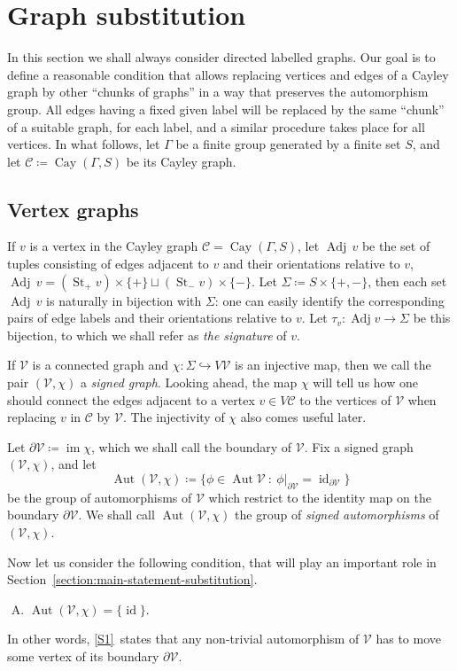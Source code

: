 \documentclass[ALCO,ThmDefs,Unicode,epreuves]{cedram}
\newcommand{\cC}{\mathcal{C}}
\newcommand{\cV}{\mathcal{V}}
\DeclareMathOperator{\St}{St}
\DeclareMathOperator{\Cay}{Cay}
\DeclareMathOperator{\aut}{Aut}
\DeclareMathOperator{\im}{im}
\DeclareMathOperator{\adj}{Adj}
\DeclareMathOperator{\id}{id}
\begin{document}
\section{Graph substitution}\label{graph-substitution}
In this section we shall always consider directed labelled graphs. Our goal is to define a reasonable condition that allows replacing vertices and edges of a Cayley graph by other ``chunks of graphs'' in a way that preserves the automorphism group. All edges having a fixed given label will be replaced by the same ``chunk'' of a suitable graph, for each label, and a similar procedure takes place for all vertices. In what follows, let $\Gamma$ be a finite group generated by a finite set $S$, and let $\cC \coloneqq \Cay(\Gamma, S)$ be its Cayley graph.

\subsection{Vertex graphs}\label{vertex-graphs-substitution}

If $v$ is a vertex in the Cayley graph $\cC = \Cay(\Gamma, S)$, let $\adj\, v$ be the set of tuples consisting of edges adjacent to $v$ and their orientations relative to $v$, \ie $\adj\, v = (\St_+ v){\times}\{+\} {\sqcup} (\St_- v){\times}\{-\}$. Let ${\Sigma}\coloneqq S{\times}\{+,-\}$, then each set $\adj\, v$ is naturally in bijection with ${\Sigma}$: one can easily identify the corresponding pairs of edge labels and their orientations relative to $v$. Let ${\tau}_v: \adj v \to {\Sigma}$ be this bijection, to which we shall refer as \emph{the signature} of $v$.

If $\cV$ is a connected graph and ${\chi}:{\Sigma}{\hookrightarrow}V\cV$ is an injective map, then we call the pair $(\cV,{\chi})$ a \emph{signed graph}. Looking ahead, the map ${\chi}$ will tell us how one should connect the edges adjacent to a vertex $v \in V\cC$ to the vertices of $\cV$ when replacing $v$ in $\cC$ by $\cV$. The injectivity of ${\chi}$ also comes useful later.
 
Let ${\partial}\cV\coloneqq \im {\chi}$, which we shall call the boundary of $\cV$. Fix a signed graph $(\cV, \chi)$, and let
\[
\aut(\cV,{\chi}) \coloneqq \{{\phi} \in \aut \cV\ :\ {\phi}|_{{\partial}\cV} = \id _{{\partial}\cV}\}
\]
be the group of automorphisms of $\cV$ which restrict to the identity map on the boundary ${\partial}\cV$. We shall call $\aut(\cV, {\chi})$ the group of \emph{signed automorphisms} of $(\cV, {\chi})$.
 
Now let us consider the following condition, that will play an important role in Section~\ref{section:main-statement-substitution}. 
\begin{enumerate}[S.\arabic*] %
\item \label{S1}
$\aut (\cV, {\chi}) = \{\id \}$. 
\end{enumerate}
In other words, \ref{S1}~states that any non-trivial automorphism of $\cV$ has to move some vertex of its boundary ${\partial}\cV$.
\end{document}
